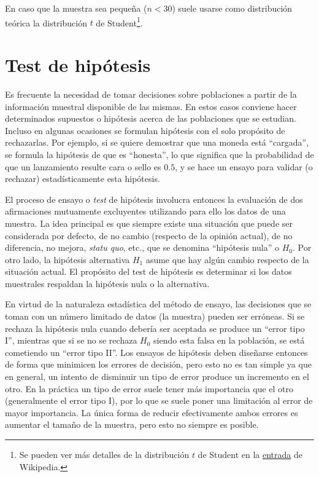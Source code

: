
En caso que la muestra sea pequeña ($n < 30$) suele usarse como distribución teórica la distribución $t$ de Student\footnote{Se pueden ver más detalles de la distribución $t$ de Student en la \href{https://es.wikipedia.org/wiki/Distribución_t_de_Student}{entrada} de Wikipedia.}.



\section{Test de hipótesis}

Es frecuente la necesidad de tomar decisiones sobre poblaciones a partir de la información muestral disponible de las mismas. En estos casos conviene hacer determinados supuestos o hipótesis acerca de las poblaciones que se estudian. Incluso en algunas ocasiones se formulan hipótesis con el solo propósito de rechazarlas. Por ejemplo, si se quiere demostrar que una moneda está ``cargada'', se formula la hipótesis de que es ``honesta'', lo que significa que la probabilidad de que un lanzamiento resulte cara o sello es $0.5$, y se hace un ensayo para validar (o rechazar) estadísticamente esta hipótesis.

El proceso de ensayo o \textit{test} de hipótesis involucra entonces la evaluación de dos afirmaciones mutuamente excluyentes utilizando para ello los datos de una muestra. La idea principal es que siempre existe una situación que puede ser considerada por defecto, de no cambio (respecto de la opinión actual), de no diferencia, no mejora, \textit{statu quo}, etc., que se denomina ``hipótesis nula'' o $H_0$. Por otro lado, la hipótesis alternativa $H_1$ asume que hay algún cambio respecto de la situación actual. El propósito del test de hipótesis es determinar si los datos muestrales respaldan la hipótesis nula o la alternativa.

En virtud de la naturaleza estadística del método de ensayo, las decisiones que se toman con un número limitado de datos (la muestra) pueden ser erróneas. Si se rechaza la hipótesis nula cuando debería ser aceptada se produce un ``error tipo I'', mientras que si se no se rechaza $H_0$ siendo esta falsa en la población, se está cometiendo un ``error tipo II''. Los ensayos de hipótesis deben diseñarse entonces de forma que minimicen los errores de decisión, pero esto no es tan simple ya que en general, un intento de disminuir un tipo de error produce un incremento en el otro. En la práctica un tipo de error suele tener más importancia que el otro (generalmente el error tipo I), por lo que se suele poner una limitación al error de mayor importancia. La única forma de reducir efectivamente ambos errores es aumentar el tamaño de la muestra, pero esto no siempre es posible.


